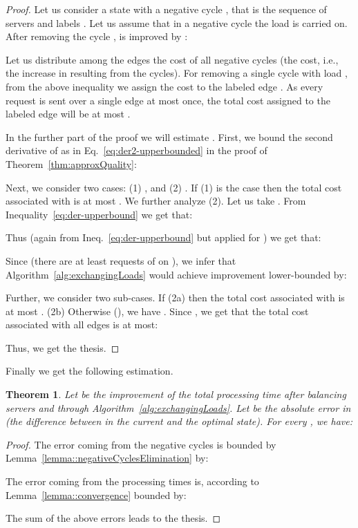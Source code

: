\documentclass[11pt]{article}
\newtheorem{theorem}{Theorem}
\begin{document}
\begin{proof}
Let us consider a state  with a negative cycle , that is the sequence of servers  and labels . Let us assume that in a negative cycle  the load  is carried on. After removing the cycle ,  is improved by :

Let us distribute among the edges the cost of all negative cycles (the cost, i.e., the increase in  resulting from the cycles). For removing a single cycle with load , from the above inequality we assign the cost  to the labeled edge . As every request is sent over a single edge at most once, the total cost assigned to the labeled edge  will be at most . 

In the further part of the proof we will estimate .
First, we bound the second derivative of  as in Eq.~\ref{eq:der2-upperbounded} in the proof of Theorem~\ref{thm:approxQuality}:

Next, we consider two cases: (1) , and (2) . If (1) is the case then the total cost associated with  is at most . We further analyze (2). Let us take . From Inequality~\ref{eq:der-upperbound} we get that: 

Thus (again from Ineq.~\ref{eq:der-upperbound} but applied for ) we get that:

Since  (there are at least  requests of  on ), we infer that Algorithm~\ref{alg:exchangingLoads} would achieve improvement  lower-bounded by:

Further, we consider two sub-cases. If (2a)  then the total cost associated with  is at most . (2b) Otherwise (), we have .
Since , we get that the total cost associated with all edges is at most:

Thus, we get the thesis. 
\end{proof}

Finally we get the following estimation.

\begin{theorem}\label{thm::finalEstimation}
Let  be the improvement of the total processing time  after balancing servers  and  through Algorithm~\ref{alg:exchangingLoads}. Let  be the absolute error in  (the difference between  in the current and the optimal state). For every , we have:

\end{theorem}
\begin{proof}
The error coming from the negative cycles is bounded by Lemma~\ref{lemma::negativeCyclesElimination} by:

The error coming from the processing times is, according to Lemma~\ref{lemma::convergence} bounded by:

The sum of the above errors leads to the thesis.
\end{proof}
\end{document}
